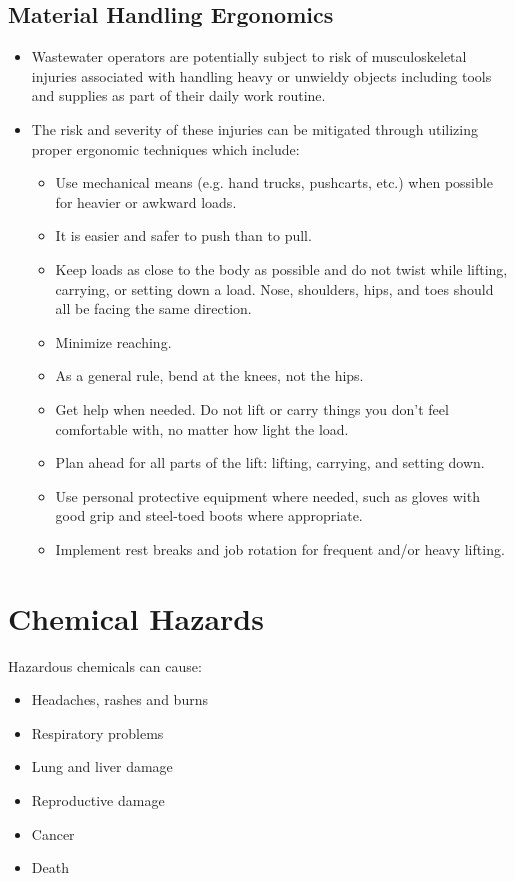 \begin{itemize}
\subsection{Material Handling Ergonomics}
\begin{itemize}
\item Wastewater operators are potentially subject to risk of musculoskeletal injuries associated with handling heavy or unwieldy objects including tools and supplies as part of their daily work routine.
\item The risk and severity of these injuries can be mitigated through utilizing proper ergonomic techniques which include:
\begin{itemize}
\item Use mechanical means (e.g. hand trucks, pushcarts, etc.) when possible for heavier or awkward loads.
\item It is easier and safer to push than to pull.
\item Keep loads as close to the body as possible and do not twist while lifting, carrying, or setting down a load. Nose, shoulders, hips, and toes should all be facing the same direction.
\item Minimize reaching.
\item As a general rule, bend at the knees, not the hips.
\item Get help when needed. Do not lift or carry things you don’t feel comfortable with, no matter how light the load.
\item Plan ahead for all parts of the lift: lifting, carrying, and setting down.
\item Use personal protective equipment where needed, such as gloves with good grip and steel-toed boots where appropriate.
\item Implement rest breaks and job rotation for frequent and/or heavy lifting.
\end{itemize}
\end{itemize}

\section{Chemical Hazards}

Hazardous chemicals can cause:
\begin{itemize}
\item Headaches, rashes and burns
\item Respiratory problems
\item Lung and liver damage
\item Reproductive damage
\item Cancer
\item Death
\end{itemize} 


\end{itemize}
